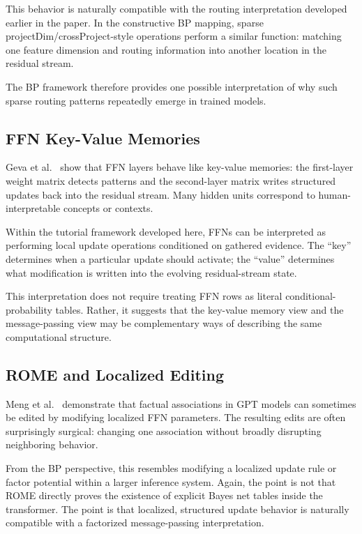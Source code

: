 This behavior is naturally compatible with the routing interpretation
developed earlier in the paper. In the constructive BP mapping, sparse
projectDim/crossProject-style operations perform a similar function:
matching one feature dimension and routing information into another
location in the residual stream.

The BP framework therefore provides one possible interpretation of why
such sparse routing patterns repeatedly emerge in trained models.

\subsection*{FFN Key-Value Memories}

Geva et al.~\cite{geva2021ffn} show that FFN layers behave like
key-value memories: the first-layer weight matrix detects patterns and
the second-layer matrix writes structured updates back into the residual
stream. Many hidden units correspond to human-interpretable concepts or
contexts.

Within the tutorial framework developed here, FFNs can be interpreted as
performing local update operations conditioned on gathered evidence. The
``key'' determines when a particular update should activate; the
``value'' determines what modification is written into the evolving
residual-stream state.

This interpretation does not require treating FFN rows as literal
conditional-probability tables. Rather, it suggests that the key-value
memory view and the message-passing view may be complementary ways of
describing the same computational structure.

\subsection*{ROME and Localized Editing}

Meng et al.~\cite{meng2022rome} demonstrate that factual associations in
GPT models can sometimes be edited by modifying localized FFN
parameters. The resulting edits are often surprisingly surgical:
changing one association without broadly disrupting neighboring
behavior.

From the BP perspective, this resembles modifying a localized update
rule or factor potential within a larger inference system. Again, the
point is not that ROME directly proves the existence of explicit Bayes
net tables inside the transformer. The point is that localized,
structured update behavior is naturally compatible with a factorized
message-passing interpretation.

